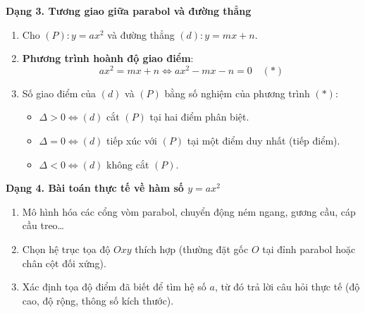 \textbf{Dạng 3. Tương giao giữa parabol và đường thẳng}
\begin{enumerate}
\item Cho $(P)\colon y = ax^2$ và đường thẳng $(d)\colon y = mx + n$.
\item \textbf{Phương trình hoành độ giao điểm}:
$$\boxed{ax^2 = mx + n \iff ax^2 - mx - n = 0 \quad (*)}$$
\item Số giao điểm của $(d)$ và $(P)$ bằng số nghiệm của phương trình $(*)$:
\begin{itemize}
\item $\Delta > 0 \iff (d)$ cắt $(P)$ tại hai điểm phân biệt.
\item $\Delta = 0 \iff (d)$ tiếp xúc với $(P)$ tại một điểm duy nhất (tiếp điểm).
\item $\Delta < 0 \iff (d)$ không cắt $(P)$.
\end{itemize}
\end{enumerate}

\textbf{Dạng 4. Bài toán thực tế về hàm số $y = ax^2$}
\begin{enumerate}
\item Mô hình hóa các cổng vòm parabol, chuyển động ném ngang, gương cầu, cáp cầu treo\dots
\item Chọn hệ trục tọa độ $Oxy$ thích hợp (thường đặt gốc $O$ tại đỉnh parabol hoặc chân cột đối xứng).
\item Xác định tọa độ điểm đã biết để tìm hệ số $a$, từ đó trả lời câu hỏi thực tế (độ cao, độ rộng, thông số kích thước).
\end{enumerate}
